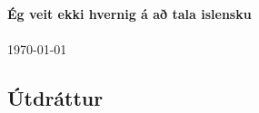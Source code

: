 \begin{center}
    \Large
    \textbf{Ég veit ekki hvernig á að tala islensku}
    ~\\[0.5cm]
    \documentauthor
    ~\\[0.5cm]
    \specialdate\today
\end{center}

\subsection*{Útdráttur}
\lipsum[9-12]
\newpage